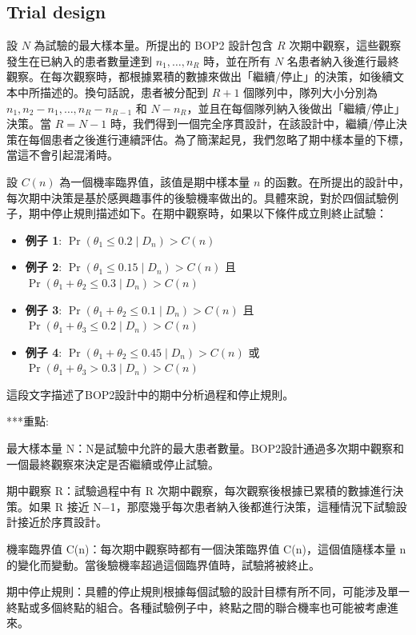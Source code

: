 \subsection{Trial design}

設 \( N \) 為試驗的最大樣本量。所提出的 BOP2 設計包含 \( R \) 次期中觀察，這些觀察發生在已納入的患者數量達到 \( n_1, \dots, n_R \) 時，並在所有 \( N \) 名患者納入後進行最終觀察。在每次觀察時，都根據累積的數據來做出「繼續/停止」的決策，如後續文本中所描述的。換句話說，患者被分配到 \( R+1 \) 個隊列中，隊列大小分別為 \( n_1, n_2 - n_1, \dots, n_R - n_{R-1} \) 和 \( N - n_R \)，並且在每個隊列納入後做出「繼續/停止」決策。當 \( R = N - 1 \) 時，我們得到一個完全序貫設計，在該設計中，繼續/停止決策在每個患者之後進行連續評估。為了簡潔起見，我們忽略了期中樣本量的下標，當這不會引起混淆時。

設 \( C(n) \) 為一個機率臨界值，該值是期中樣本量 \( n \) 的函數。在所提出的設計中，每次期中決策是基於感興趣事件的後驗機率做出的。具體來說，對於四個試驗例子，期中停止規則描述如下。在期中觀察時，如果以下條件成立則終止試驗：

\begin{itemize}
    \item \textbf{例子 1}: \( \Pr(\theta_1 \leq 0.2 \mid D_n) > C(n) \)
    \item \textbf{例子 2}: \( \Pr(\theta_1 \leq 0.15 \mid D_n) > C(n) \) 且 \( \Pr(\theta_1 + \theta_2 \leq 0.3 \mid D_n) > C(n) \)
    \item \textbf{例子 3}: \( \Pr(\theta_1 + \theta_2 \leq 0.1 \mid D_n) > C(n) \) 且 \( \Pr(\theta_1 + \theta_3 \leq 0.2 \mid D_n) > C(n) \)
    \item \textbf{例子 4}: \( \Pr(\theta_1 + \theta_2 \leq 0.45 \mid D_n) > C(n) \) 或 \( \Pr(\theta_1 + \theta_3 > 0.3 \mid D_n) > C(n) \)
\end{itemize}

這段文字描述了BOP2設計中的期中分析過程和停止規則。

***重點:

最大樣本量 
N：N是試驗中允許的最大患者數量。BOP2設計通過多次期中觀察和一個最終觀察來決定是否繼續或停止試驗。

期中觀察 
R：試驗過程中有 R 次期中觀察，每次觀察後根據已累積的數據進行決策。如果 R 接近 N−1，那麼幾乎每次患者納入後都進行決策，這種情況下試驗設計接近於序貫設計。

機率臨界值 C(n)：每次期中觀察時都有一個決策臨界值 C(n)，這個值隨樣本量 n 的變化而變動。當後驗機率超過這個臨界值時，試驗將被終止。

期中停止規則：具體的停止規則根據每個試驗的設計目標有所不同，可能涉及單一終點或多個終點的組合。各種試驗例子中，終點之間的聯合機率也可能被考慮進來。



